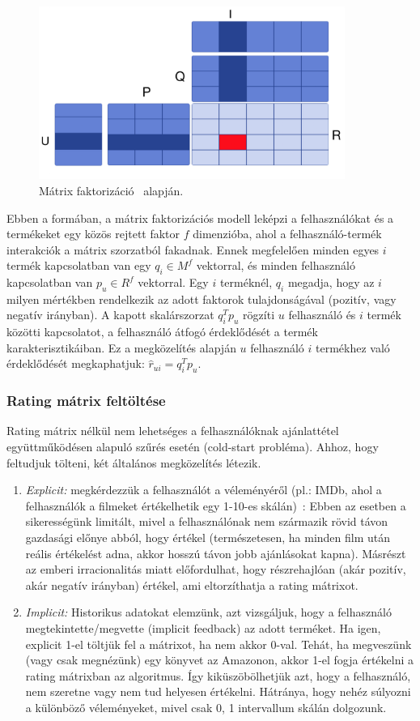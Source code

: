 \documentclass[a4paper,12pt]{article}
\begin{document}
\begin{figure}[ht!]
\centering
\includegraphics[width=100mm]{img/factor.png}
\caption{Mátrix faktorizáció~\cite{mf_databricks} alapján.}
\end{figure}

Ebben a formában, a mátrix faktorizációs modell leképzi a felhasználókat és a termékeket egy közös rejtett faktor $f$ dimenzióba, ahol a felhasználó-termék interakciók a mátrix szorzatból fakadnak. Ennek megfelelően minden egyes $i$ termék kapcsolatban van egy $q_{i} \in M^f$ vektorral, és minden felhasználó kapcsolatban van $p_{u} \in R^f$ vektorral. Egy $i$ terméknél, $q_{i}$ megadja, hogy az $i$ milyen mértékben rendelkezik az adott faktorok tulajdonságával (pozitív, vagy negatív irányban). A kapott skalárszorzat $q_{i}^Tp_{u}$ rögzíti $u$ felhasználó és $i$ termék közötti kapcsolatot, a felhasználó átfogó érdeklődését a termék karakterisztikáiban. Ez a megközelítés alapján $u$ felhasználó $i$ termékhez való érdeklődését megkaphatjuk: 
$\hat{r}_{ui} = q_{i}^T p_{u}$.

\subsubsection{Rating mátrix feltöltése}
Rating mátrix nélkül nem lehetséges a felhasználóknak ajánlattétel együttműködésen alapuló szűrés esetén (cold-start probléma). Ahhoz, hogy feltudjuk tölteni, két általános megközelítés létezik.
\begin{enumerate}
\item \textsl{Explicit:} megkérdezzük a felhasználót a véleményéről (pl.: IMDb, ahol a felhasználók a filmeket értékelhetik egy 1-10-es skálán)~\cite{imdb}: Ebben az esetben a sikerességünk limitált, mivel a felhasználónak nem származik rövid távon gazdasági előnye abból, hogy értékel (természetesen, ha minden film után reális értékelést adna, akkor hosszú távon jobb ajánlásokat kapna). Másrészt az emberi irracionalitás miatt előfordulhat, hogy részrehajlóan (akár pozitív, akár negatív irányban) értékel, ami eltorzíthatja a rating mátrixot.~\cite{introspection}
\item \textsl{Implicit:} Historikus adatokat elemzünk, azt vizsgáljuk, hogy a felhasználó megtekintette/megvette (implicit feedback) az adott terméket. Ha igen, explicit 1-el töltjük fel a mátrixot, ha nem akkor 0-val. Tehát, ha megveszünk (vagy csak megnézünk) egy könyvet az Amazonon, akkor 1-el fogja értékelni a rating mátrixban az algoritmus. Így kiküszöbölhetjük azt, hogy a felhasználó, nem szeretne vagy nem tud helyesen értékelni. Hátránya, hogy nehéz súlyozni a különböző véleményeket, mivel csak {0, 1} intervallum skálán dolgozunk.
\end{enumerate}
\end{document}
